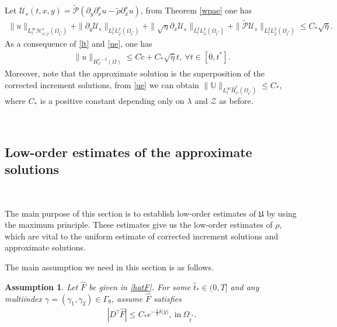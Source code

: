 \documentclass{amsart}
\numberwithin{equation}{section}
\newtheorem{assumption}{Assumption}[section]
\newcommand\y{{{\langle y \rangle}}}
\begin{document}
Let
$\mathcal{U}_{s}(t,x,y)=\tilde{\mathcal{P}}\left(\partial_{y}\partial_{x}^{s}u-\tilde{\rho}\partial_{x}^{s}u\right)$,
from Theorem \ref{wpae} one has
\begin{align}\label{ue}
\|u\|_{L_{t}^{\infty}\mathcal{H}_{\psi,\tilde{\varphi}}^{s}(\Omega_{t^{*}})}
+\|\partial_{y}\mathcal{U}_{s}\|_{L_{t}^{2}L_{\tilde{\varphi}}^{2}(\Omega_{t^{*}})}
+\|\sqrt{\eta}\partial_{x}\mathcal{U}_{s}\|_{L_{t}^{2}L_{\tilde{\varphi}}^{2}(\Omega_{t^{*}})}
+\|\tilde{\mathcal{P}}\mathcal{U}_{s}\|_{L_{t}^{2}L_{\tilde{\varphi}}^{2}(\Omega_{t^{*}})}
\leq C_{*}\sqrt{\bar{\eta}}.
\end{align}
As a consequence of \eqref{lt} and \eqref{ue}, one has
\begin{align}\label{us-3}
\|u\|_{H_{\psi}^{s-3}(\Omega)}\leq C\check{c}+C_{*}\sqrt{\bar{\eta}}t,~\forall t\in[0,t^{*}].
\end{align}
Moreover, note that the approximate solution is the superposition of the corrected increment solutions, from \eqref{ue} we can obtain $\|\mathbb{U}\|_{L_{t}^{\infty}\hat{H}_{\psi}^{s}(\Omega_{t^{*}})}\leq C_{*}$, where $C_{*}$ is a positive constant depending only on $\lambda$ and $\mathcal{Z}$ as before.

~~~~~~~~~~

\subsection{Low-order estimates of the approximate solutions}~

The main purpose of this section is to establish low-order estimates of $\mathfrak{U}$ by using the maximum principle. These estimates give us the low-order estimates of $\rho$, which are vital to the uniform estimate of corrected increment solutions and approximate solutions.

The main assumption we need in this section is as follows.
\begin{assumption}\label{FA}
Let $\hat{F}$ be given  in \eqref{hatF}. For some $\hat{t}_{*}\in(0,T]$ and any multiindex $\gamma=(\gamma_{1},\gamma_{2})\in\Gamma_{9}$, assume $\hat{F}$ satisfies
\begin{align}\label{Fd}
|D^{\gamma}\hat{F}|\leq C_{*}e^{-\frac{4}{3}\delta\y},~\text{in}~\Omega_{\hat{t}^{*}}.
\end{align}
\end{assumption}
\end{document}
